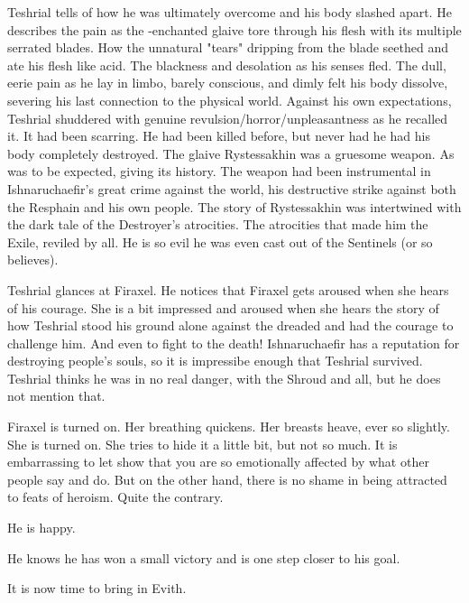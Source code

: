 Teshrial tells of how he was ultimately overcome and his body slashed apart. 
He describes the pain as the \XzaiShann-enchanted glaive tore through his flesh with its multiple serrated blades.
How the unnatural "tears" dripping from the blade seethed and ate his flesh like acid. 
The blackness and desolation as his senses fled. 
The dull, eerie pain as he lay in limbo, barely conscious, and dimly felt his body dissolve, severing his last connection to the physical world. 
Against his own expectations, Teshrial shuddered with genuine revulsion/horror/unpleasantness as he recalled it. 
It had been scarring. 
He had been killed before, but never had he had his body completely destroyed. 
The glaive Rystessakhin was a gruesome weapon. 
As was to be expected, giving its history. 
The weapon had been instrumental in Ishnaruchaefir's great crime against the world, his destructive strike against both the Resphain and his own people. 
The story of Rystessakhin was intertwined with the dark tale of the Destroyer's atrocities. 
The atrocities that made him the Exile, reviled by all. 
He is so evil he was even cast out of the Sentinels (or so \Teshrial believes). 

Teshrial glances at Firaxel. 
He notices that Firaxel gets aroused when she hears of his courage. 
She is a bit impressed and aroused when she hears the story of how Teshrial stood his ground alone against the dreaded \Ishnaruchaefir{} and had the courage to challenge him. 
And even to fight to the death! 
Ishnaruchaefir has a reputation for destroying people's souls, so it is impressibe enough that Teshrial survived. 
Teshrial thinks he was in no real danger, with the Shroud and all, but he does not mention that. 

Firaxel is turned on. 
Her breathing quickens. 
Her breasts heave, ever so slightly.
She is turned on. 
She tries to hide it a little bit, but not so much. 
It is embarrassing to let show that you are so emotionally affected by what other people say and do. 
But on the other hand, there is no shame in being attracted to feats of heroism. 
Quite the contrary. 

He is happy. 

He knows he has won a small victory and is one step closer to his goal. 

It is now time to bring in Evith. 

